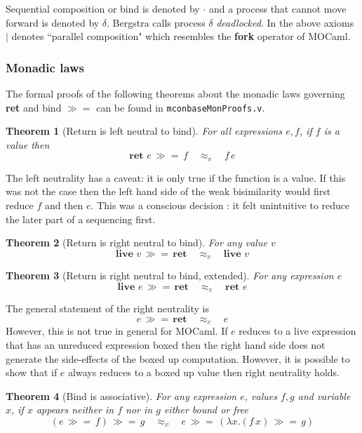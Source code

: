 \documentclass[12pt,twoside,notitlepage]{report}
\theoremstyle{plain}%
\newtheorem{thm}{Theorem}[section]
\theoremstyle{definition}
\theoremstyle{remark}
\begin{document}
Sequential composition or bind is denoted by $ \cdot $ and a process that cannot move forward is denoted by $ \delta $. Bergstra\cite{bergstra1984process} calls process $ \delta $ \textit{deadlocked}. In the above axioms $ \mid $ denotes ``parallel composition" which resembles the \textbf{fork} operator of MOCaml.

\subsubsection{Monadic laws}
\label{sec:equivs}
The formal proofs of the following theorems about the monadic laws governing \textbf{ret} and bind $ \gg= $ can be found in \verb|mconbaseMonProofs.v|.

\begin{thm}[Return is left neutral to bind]
For all expressions $ e, f $, if $ f $ is a value then
\[ \textbf{ret } e\,\gg=\, f\quad \approx_v \quad f\,e \]
\end{thm}

The left neutrality has a caveat: it is only true if the function is a value. If this was not the case then the left hand side of the weak bisimilarity would first reduce $ f $ and then $ e $. This was a conscious decision : it felt unintuitive to reduce the later part of a sequencing first. 

\begin{thm}[Return is right neutral to bind]
For any value $ v$
\[  \textbf{live }v\,\gg=\, \textbf{ret}\quad \approx_v \quad \textbf{live }v \]
\end{thm}

\begin{thm}[Return is right neutral to bind, extended]
For any expression $ e$
\[  \textbf{live }e\,\gg=\, \textbf{ret}\quad \approx_v \quad \textbf{ret } e \]
\end{thm}

The general statement of the right neutrality is 
\[  e\,\gg=\, \textbf{ret}\quad \approx_v \quad e \]
However, this is not true in general for MOCaml. If $ e $ reduces to a live expression that has an unreduced expression boxed then the right hand side does not generate the side-effects of the boxed up computation. However, it is possible to show that if $ e $ always reduces to a boxed up value then right neutrality holds.

\begin{thm}[Bind is associative]
For any expression $ e $, values $ f, g $ and variable $ x $, if $ x $ appears neither in $ f $ nor in $ g $ either bound or free
\[ (e\, \gg=\, f) \, \gg=\, g \quad \approx_v \quad e\, \gg=\, (\lambda x. (f\, x) \, \gg=\, g ) \]
\end{thm}
\end{document}
